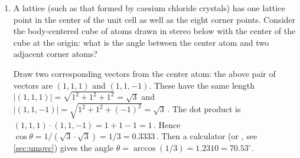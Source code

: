 \begin{example}
\begin{enumerate}
\item A  lattice (such as that formed by caesium chloride crystals) has one lattice point in the center of the unit cell as well as the eight corner points.
Consider the body-centered cube of atoms drawn in stereo below with the center of the cube at the origin: what is the angle between the center atom and two adjacent corner atoms?
\begin{center}
 {
}
\end{center}
\begin{solution} 
Draw two corresponding vectors from the center atom: the above pair of vectors are \((1,1,1)\) and \((1,1,-1)\).
These have the same length \(|(1,1,1)|=\sqrt{1^2+1^2+1^2}=\sqrt3\) and \(|(1,1,-1)|=\sqrt{1^2+1^2+(-1)^2}=\sqrt3\)\,.
The dot product is \((1,1,1)\cdot(1,1,-1)=1+1-1=1\)\,.
Hence \(\cos\theta=1/(\sqrt3\cdot\sqrt3)=1/3=0.3333\)\,.
Then a calculator (or \script, see \autoref{sec:umovc}) gives the angle \(\theta =\arccos(1/3) =1.2310 =70.53^\circ\).
\end{solution}
\end{enumerate}
\end{example}


 




